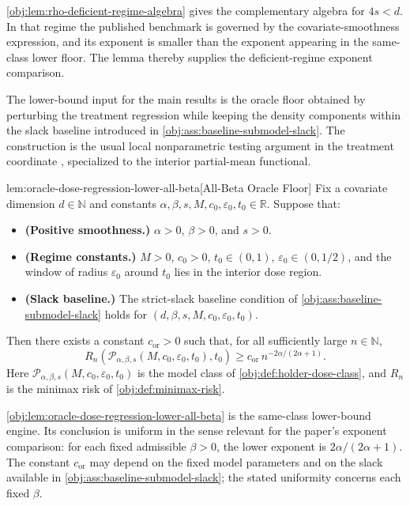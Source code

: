 \cref{obj:lem:rho-deficient-regime-algebra} gives the complementary algebra for \(4s<d\). In that regime the published benchmark is governed by the covariate-smoothness expression, and its exponent is smaller than the exponent appearing in the same-class lower floor. The lemma thereby supplies the deficient-regime exponent comparison.

The lower-bound input for the main results is the oracle floor obtained by perturbing the treatment regression while keeping the density components within the slack baseline introduced in \cref{obj:ass:baseline-submodel-slack}. The construction is the usual local nonparametric testing argument in the treatment coordinate \citep{stone1982,tsybakov2009,goldenshluger2020}, specialized to the interior partial-mean functional.

\begin{lemmav}{lem:oracle-dose-regression-lower-all-beta}[All-Beta Oracle Floor]
Fix a covariate dimension $d\in\mathbb N$ and constants
$\alpha,\beta,s,M,c_0,\varepsilon_0,t_0\in\mathbb R$. Suppose that:
\begin{itemize}
\item \textbf{(Positive smoothness.)} $\alpha>0$, $\beta>0$, and $s>0$.
\item \textbf{(Regime constants.)} $M>0$, $c_0>0$, $t_0\in(0,1)$, $\varepsilon_0\in(0,1/2)$, and the window of radius $\varepsilon_0$ around $t_0$ lies in the interior dose region.
\item \textbf{(Slack baseline.)} The strict-slack baseline condition of \cref{obj:ass:baseline-submodel-slack} holds for $(d,\beta,s,M,c_0,\varepsilon_0,t_0)$.
\end{itemize}
Then there exists a constant $c_{\mathrm{or}}>0$ such that, for all sufficiently large $n\in\mathbb N$,
\[
R_n\!\left(\mathcal P_{\alpha,\beta,s}(M,c_0,\varepsilon_0,t_0),t_0\right)
\ge
c_{\mathrm{or}}\, n^{-2\alpha/(2\alpha+1)} .
\]
Here $\mathcal P_{\alpha,\beta,s}(M,c_0,\varepsilon_0,t_0)$ is the model class of \cref{obj:def:holder-dose-class}, and $R_n$ is the minimax risk of \cref{obj:def:minimax-risk}.
\end{lemmav}

\cref{obj:lem:oracle-dose-regression-lower-all-beta} is the same-class lower-bound engine. Its conclusion is uniform in the sense relevant for the paper's exponent comparison: for each fixed admissible \(\beta>0\), the lower exponent is \(2\alpha/(2\alpha+1)\). The constant \(c_{\mathrm{or}}\) may depend on the fixed model parameters and on the slack available in \cref{obj:ass:baseline-submodel-slack}; the stated uniformity concerns each fixed \(\beta\).
